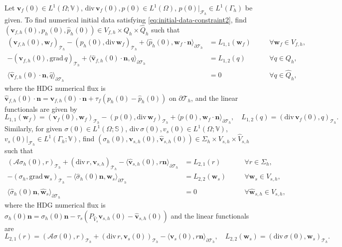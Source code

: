 \documentclass[10pt,letterpaper]{amsart}
\theoremstyle{plain} %
\theoremstyle{remark} %
\newcommand{\vect}[1]{\mathbf{#1}}
\newcommand{\divergence}{\mathrm{div}\,}
\newcommand{\grad}{\mathrm{grad}\,}
\newcommand{\Ael}{\mathcal{A}} %
\newcommand{\Th}{\mathcal{T}_h} %
\newcommand{\Thprod}[2]{( #1, #2 )_{\mathcal{T}_h}}
\newcommand{\pThprod}[2]{\langle #1, #2 \rangle_{\partial \mathcal{T}_{h}}}
\begin{document}
Let $\vect{v}_f(0) \in L^1(\Omega; \mathbb{V})$, $\divergence \vect{v}_f(0), p(0) \in L^1(\Omega)$, $p(0)|_{\mathcal{F}_h} \in L^1(\Gamma_h)$ be given. To find numerical initial data satisfying \eqref{eq:initial-data-constraint2}, find $(\vect{v}_{f,h}(0), p_h(0), \widehat{p}_h(0)) \in V_{f,h} \times Q_{h} \times \widehat{Q}_h$ such that 
%
\begin{align*}
	\Thprod{\vect{v}_{f,h}(0)}{\vect{w}_{f}} - \Thprod{p_{h}(0)}{\divergence \vect{w}_{f}} + \pThprod{\widehat{p}_h(0)}{\vect{w}_{f}\cdot \vect{n}} 
	& = L_{1,1}(\vect{w}_f) && \quad \forall \vect{w}_f\in V_{f,h},
	\\
	-\Thprod{\vect{v}_{f,h}(0)}{\grad q} + \pThprod{\widehat{\vect{v}}_{f,h}(0)\cdot \vect{n}}{q} 
	&= L_{1,2}(q) && \quad \forall q \in Q_{h},
	\\
	\pThprod{ \widehat{\vect{v}}_{f,h}(0)\cdot \vect{n} }{\widehat{q}} 
	&= 0 && \quad \forall q \in \widehat{Q}_{h},
\end{align*}
where the HDG numerical flux is $\widehat{\vect{v}}_{f,h}(0)\cdot \vect{n}=\vect{v}_{f,h}(0)\cdot\vect{n} + \tau_{f} (p_{h}(0) - \widehat{p}_{h}(0))$ on $\partial \Th$, and the linear functionals are given by
\[
L_{1,1}(\vect{w}_f) = \Thprod{\vect{v}_{f}(0)}{\vect{w}_{f}} - \Thprod{p(0)}{\divergence \vect{w}_{f}} + \pThprod{p(0)}{\vect{w}_{f}\cdot \vect{n}} ,\quad
L_{1,2} (q) = \Thprod{\divergence\vect{v}_{f}(0)}{q}.
\]
Similarly, for given $\sigma(0) \in L^1(\Omega; \mathbb{S})$, $\divergence \sigma(0), v_{s}(0) \in L^1(\Omega; \mathbb{V})$, $v_{s}(0)|_{\mathcal{F}_h} \in L^1(\Gamma_h; \mathbb{V})$, find $(\sigma_h(0), \vect{v}_{s,h}(0), \widehat{\vect{v}}_{s,h}(0)) \in \Sigma_h \times V_{s,h} \times \widehat{V}_{s,h}$ such that 
\begin{align*}
	\Thprod{\Ael \sigma_{h}(0) }{r} +\Thprod{\divergence r}{\vect{v}_{s,h}} -\pThprod{\widehat{\vect{v}}_{s,h}(0)}{r \vect{n}} &= L_{2,1}(r)&& \quad \forall r\in \Sigma_h, 
    \\
	-\Thprod{\sigma_{h}}{\grad \vect{w}_{s}} - \pThprod{ \widehat{\sigma}_h(0)\vect{n}}{\vect{w}_{s}} &= 
	L_{2,2}(\vect{w}_s) &&\quad \forall \vect{w}_s\in V_{s,h},
    \\
	\pThprod{\widehat{\sigma}_h(0)\vect{n}}{\widehat{\vect{w}}_s} &= 0 && \quad\forall \widehat{\vect{w}}_{s,h} \in \widehat{V}_{s,h},
\end{align*}
where the HDG numerical flux is $\widehat{\sigma}_h(0)\vect{n} = \sigma_h(0) \vect{n} - \tau_{s} ({P_{\widehat{V}_s}} \vect{v}_{s,h}(0) - \widehat{\vect{v}}_{s,h}(0))$ and the linear functionals are
\[
L_{2,1}(r) = \Thprod{\Ael \sigma(0) }{r} +\Thprod{\divergence r}{\vect{v}_{s}(0)} -\pThprod{\vect{v}_{s}(0)}{r \vect{n}} ,\quad 
L_{2,2}(\vect{w}_s) = \Thprod{\divergence \sigma (0)}{\vect{w}_{s}}.
\]
\end{document}
